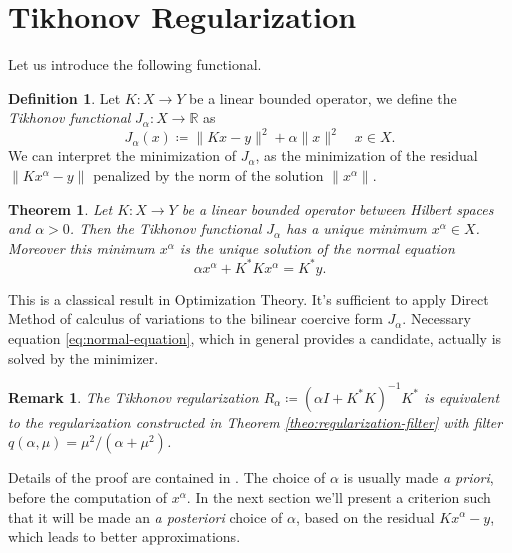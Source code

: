\documentclass[10pt, a4paper, twoside, openright]{book}
\theoremstyle{definition}
\newtheorem{definition}[subsection]{Definition}
\theoremstyle{plain}
\newtheorem{theorem}[subsection]{Theorem}
\theoremstyle{plain}
\theoremstyle{plain}
\theoremstyle{plain}
\newtheorem{remark}[subsection]{Remark}
\theoremstyle{plain}
\theoremstyle{plain}
\theoremstyle{plain}
\theoremstyle{plain}
\begin{document}
\section{Tikhonov Regularization}
Let us introduce the following functional.
\begin{definition}
 Let $K:X\to Y$ be a linear bounded operator, we define the \emph{Tikhonov functional} $J_\alpha:X\to \mathbb{R}$ as
 \begin{equation}
  J_\alpha(x)\coloneqq\|Kx - y\|^2 + \alpha\|x\|^2\quad x\in X.\label{eq:def-tikhonov-func}
 \end{equation}
 We can interpret the minimization of $J_\alpha$, as the minimization of the residual $\|Kx^{\alpha} - y\|$ penalized by the norm of the solution $\|x^\alpha\|$.
\end{definition}
\begin{theorem}
 Let $K:X\to Y$ be a linear bounded operator between Hilbert spaces and $\alpha>0$. Then the Tikhonov functional $J_\alpha$ 
 has a unique minimum $x^\alpha\in X$. Moreover this minimum $x^\alpha$ is the unique solution of the \emph{normal equation}
 \begin{equation}
  \alpha x^\alpha + K^*Kx^\alpha = K^*y.\label{eq:normal-equation}
 \end{equation}
\end{theorem}
This is a classical result in Optimization Theory. It's sufficient to apply Direct Method of calculus of variations
to the bilinear coercive form $J_\alpha$.  
Necessary equation \eqref{eq:normal-equation}, which in general provides a candidate, actually is solved by the minimizer.
\begin{remark}
 The Tikhonov regularization $R_\alpha\coloneqq (\alpha I + K^*K)^{-1}K^*$ is equivalent 
 to the regularization constructed in Theorem \ref{theo:regularization-filter} with filter 
 $q(\alpha,\mu) = \mu^2/(\alpha + \mu^2)$.
\end{remark}
Details of the proof are contained in \cite{kirsch:book}.
The choice of $\alpha$ is usually made \emph{a priori}, before the computation of $x^\alpha$. In the next section 
we'll present a criterion such that it will be made an \emph{a posteriori} choice of $\alpha$, based on the residual $Kx^\alpha - y$, which leads to better approximations.
\end{document}
